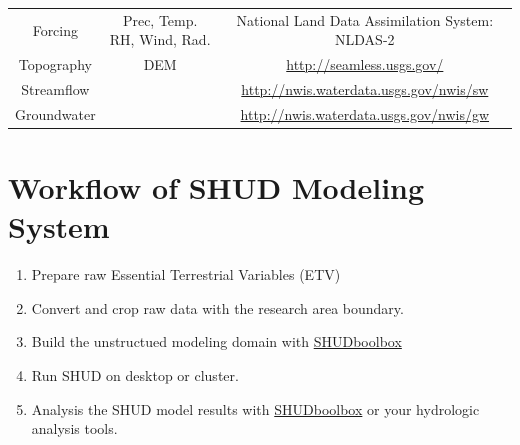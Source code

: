\documentclass[]{scrbook}
\providecommand{\tightlist}{%
  \setlength{\itemsep}{0pt}\setlength{\parskip}{0pt}}
\begin{document}
\begin{longtable}[]{@{}ccc@{}}
\begin{minipage}[t]{0.11\columnwidth}
Forcing\strut
\end{minipage} & \begin{minipage}[t]{0.19\columnwidth}\centering\strut
Prec, Temp. RH, Wind, Rad.\strut
\end{minipage} & \begin{minipage}[t]{0.42\columnwidth}\centering\strut
National Land Data Assimilation System: NLDAS-2\strut
\end{minipage}\tabularnewline
\begin{minipage}[t]{0.11\columnwidth}\centering\strut
Topography\strut
\end{minipage} & \begin{minipage}[t]{0.19\columnwidth}\centering\strut
DEM\strut
\end{minipage} & \begin{minipage}[t]{0.42\columnwidth}\centering\strut
\url{http://seamless.usgs.gov/}\strut
\end{minipage}\tabularnewline
\begin{minipage}[t]{0.11\columnwidth}\centering\strut
Streamflow\strut
\end{minipage} & \begin{minipage}[t]{0.19\columnwidth}\centering\strut
\strut
\end{minipage} & \begin{minipage}[t]{0.42\columnwidth}\centering\strut
\url{http://nwis.waterdata.usgs.gov/nwis/sw}\strut
\end{minipage}\tabularnewline
\begin{minipage}[t]{0.11\columnwidth}\centering\strut
Groundwater\strut
\end{minipage} & \begin{minipage}[t]{0.19\columnwidth}\centering\strut
\strut
\end{minipage} & \begin{minipage}[t]{0.42\columnwidth}\centering\strut
\url{http://nwis.waterdata.usgs.gov/nwis/gw}\strut
\end{minipage}\tabularnewline
\bottomrule
\end{longtable}

\section{Workflow of SHUD Modeling
System}\label{workflow-of-shud-modeling-system}

\begin{enumerate}
\def\labelenumi{\arabic{enumi}.}
\tightlist
\item
  Prepare raw Essential Terrestrial Variables (ETV)
\item
  Convert and crop raw data with the research area boundary.
\item
  Build the unstructued modeling domain with
  \href{https://github.com/SHUD-System/SHUD}{SHUDboolbox}
\item
  Run SHUD on desktop or cluster.
\item
  Analysis the SHUD model results with
  \href{https://github.com/SHUD-System/SHUDboolbox}{SHUDboolbox} or your
  hydrologic analysis tools.
\end{enumerate}
\end{document}
